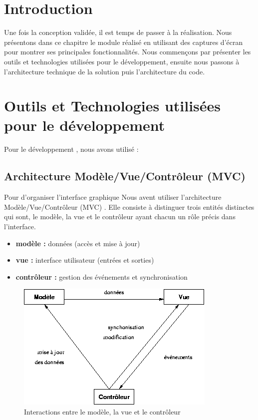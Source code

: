 \section{Introduction}
Une fois la conception validée, il est temps de passer à la réalisation. Nous présentons dans ce chapitre le module réalisé en utilisant des captures d’écran pour montrer ses principales fonctionnalités. Nous commençons par présenter les outils et technologies utilisées pour le développement, ensuite nous passons à l’architecture technique de la solution puis l’architecture du code.

\section{Outils et Technologies utilisées pour le développement}
Pour le développement , nous avons utilisé : 

    \subsection{Architecture Modèle/Vue/Contrôleur (MVC)}


Pour d'organiser  l'interface graphique Nous avent utiliser l'architecture Modèle/Vue/Contrôleur (MVC) . Elle consiste à distinguer trois entités distinctes qui sont, le modèle, la vue et le contrôleur ayant chacun un rôle précis dans l'interface. \parencite{mvc}

\begin{itemize}
	\item 	\textbf{modèle :} données (accès et mise à jour)
	\item 	\textbf{vue :} interface utilisateur (entrées et sorties)
	\item 	\textbf{contrôleur :} gestion des événements et synchronisation
\end{itemize}


\begin{figure}[H]
	\centering
	\includegraphics[width=0.6\linewidth]{images/mvc}
	\caption{Interactions entre le modèle, la vue et le contrôleur \parencite{mvc}}
	\label{fig:mvc}
\end{figure}


